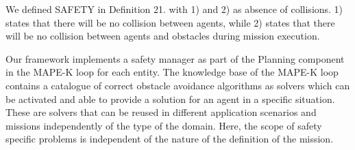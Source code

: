 \documentclass[journal]{IEEEtran}
\theoremstyle{definition}
\begin{document}




We defined SAFETY in Definition 21. with 1) and 2) as  absence of collisions. 
1) states that there will be no collision between agents, 
while 2) states that there will be no collision between agents and obstacles during mission execution. 






Our framework implements a safety manager as part of the Planning component in the MAPE-K loop for each entity. The knowledge base of the MAPE-K loop contains a catalogue of correct obstacle avoidance algorithms as solvers which can be activated and able to provide a solution for an agent in a specific situation. These are solvers that can be reused in different application scenarios and missions independently of the type of the domain. Here,  the  scope  of safety specific  problems  is independent of the  nature  of  the definition of the mission.  
\end{document}
